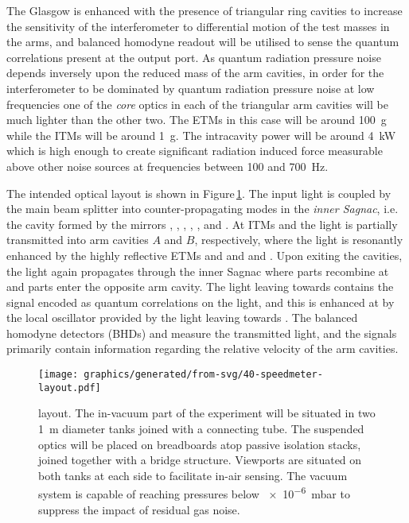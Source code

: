 The Glasgow \SSMEXPT{} is enhanced with the presence of triangular ring cavities to increase the sensitivity of the interferometer to differential motion of the test masses in the arms, and balanced homodyne readout will be utilised to sense the quantum correlations present at the output port. As quantum radiation pressure noise depends inversely upon the reduced mass of the arm cavities, in order for the interferometer to be dominated by quantum radiation pressure noise at low frequencies one of the \emph{core} optics in each of the triangular arm cavities will be much lighter than the other two. The \glspl{ETM} in this case will be around \SI{100}{\gram} while the \glspl{ITM} will be around \SI{1}{\gram}. The intracavity power will be around \SI{4}{\kilo\watt} which is high enough to create significant radiation induced force measurable above other noise sources at frequencies between \num{100} and \SI{700}{\hertz}.

The intended optical layout is shown in Figure\,\ref{fig:ssm-layout}. The input light is coupled by the main beam splitter \MSIX{} into counter-propagating modes in the \emph{inner Sagnac}, i.e. the cavity formed by the mirrors \MSIX{}, \MSEVEN{}, \MONEA{}, \MTEN{}, \MNINE{}, \MEIGHT{} and \MONEB{}. At \glspl{ITM} \MONEA{} and \MONEB{} the light is partially transmitted into arm cavities $A$ and $B$, respectively, where the light is resonantly enhanced by the highly reflective \glspl{ETM} \MTWOA{} and \MTHREEA{} and \MTWOB{} and \MTHREEB{}. Upon exiting the cavities, the light again propagates through the inner Sagnac where parts recombine at \MSIX{} and parts enter the opposite arm cavity. The light leaving \MSIX{} towards \MFOURTEEN{} contains the signal encoded as quantum correlations on the light, and this is enhanced at \MSIXTEEN{} by the local oscillator provided by the light leaving \MSIX{} towards \MTWELVE{}. The balanced homodyne detectors (\glspl{BHD}) \HDA{} and \HDB{} measure the transmitted light, and the signals primarily contain information regarding the relative velocity of the arm cavities.

\begin{figure}
  \centering
  \texttt{[image: graphics/generated/from-svg/40-speedmeter-layout.pdf]}
  \caption[\SSMEXPT{} layout]{\label{fig:ssm-layout}\SSMEXPT{} layout. The in-vacuum part of the experiment will be situated in two \SI{1}{\meter} diameter tanks joined with a connecting tube. The suspended optics will be placed on breadboards atop passive isolation stacks, joined together with a bridge structure. Viewports are situated on both tanks at each side to facilitate in-air sensing. The vacuum system is capable of reaching pressures below \SI{e-6}{\milli\bar} to suppress the impact of residual gas noise.}
\end{figure}

